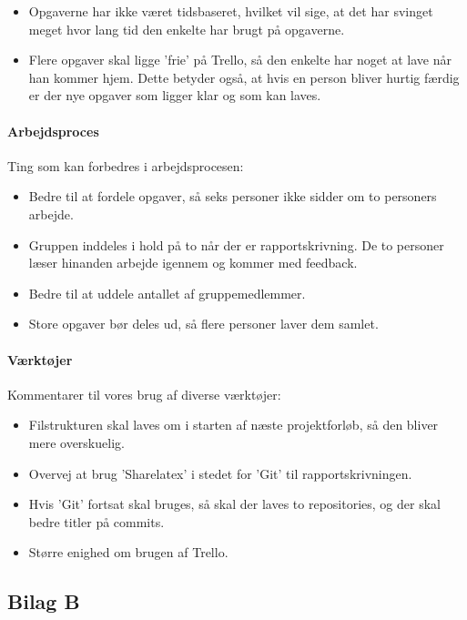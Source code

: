 \documentclass[oneside,a4paper,titlepage]{article}
\begin{document}
\begin{itemize}
\item Opgaverne har ikke været tidsbaseret, hvilket vil sige, at det har svinget meget hvor lang tid den enkelte har brugt på opgaverne.
\item Flere opgaver skal ligge 'frie' på Trello, så den enkelte har noget at lave når han kommer hjem. Dette betyder også, at hvis en person bliver hurtig færdig er der nye opgaver som ligger klar og som kan laves.
\end{itemize}

\paragraph{Arbejdsproces}

Ting som kan forbedres i arbejdsprocesen:

\begin{itemize}
\item Bedre til at fordele opgaver, så seks personer ikke sidder om to personers arbejde. 
\item Gruppen inddeles i hold på to når der er rapportskrivning. De to personer læser hinanden arbejde igennem og kommer med feedback.
\item Bedre til at uddele antallet af gruppemedlemmer. 
\item Store opgaver bør deles ud, så flere personer laver dem samlet.
\end{itemize}

\paragraph{Værktøjer}

Kommentarer til vores brug af diverse værktøjer:

\begin{itemize}
\item Filstrukturen skal laves om i starten af næste projektforløb, så den bliver mere overskuelig.
\item Overvej at brug 'Sharelatex' i stedet for 'Git' til rapportskrivningen. 
\item Hvis 'Git' fortsat skal bruges, så skal der laves to repositories, og der skal bedre titler på commits. 
\item Større enighed om brugen af Trello.
\end{itemize}
\subsection{Bilag B}
\end{document}
